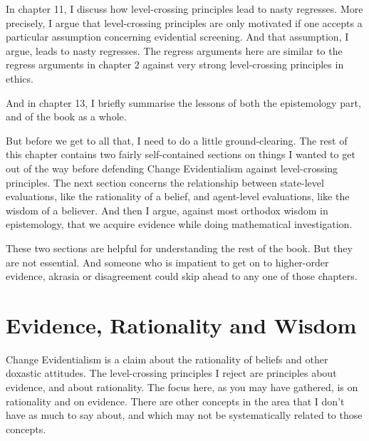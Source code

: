In chapter 11, I discuss how level-crossing principles lead to nasty regresses. More precisely, I argue that level-crossing principles are only motivated if one accepts a particular assumption concerning evidential screening. And that assumption, I argue, leads to nasty regresses. The regress arguments here are similar to the regress arguments in chapter 2 against very strong level-crossing principles in ethics.

And in chapter 13, I briefly summarise the lessons of both the epistemology part, and of the book as a whole.

But before we get to all that, I need to do a little ground-clearing. The rest of this chapter contains two fairly self-contained sections on things I wanted to get out of the way before defending Change Evidentialism against level-crossing principles. The next section concerns the relationship between state-level evaluations, like the rationality of a belief, and agent-level evaluations, like the wisdom of a believer. And then I argue, against most orthodox wisdom in epistemology, that we acquire evidence while doing mathematical investigation.

These two sections are helpful for understanding the rest of the book. But they are not essential. And someone who is impatient to get on to higher-order evidence, akrasia or disagreement could skip ahead to any one of those chapters.

\section{Evidence, Rationality and Wisdom}
\label{evidencerationalityandwisdom}

Change Evidentialism is a claim about the rationality of beliefs and other doxastic attitudes. The level-crossing principles I reject are principles about evidence, and about rationality. The focus here, as you may have gathered, is on rationality and on evidence. There are other concepts in the area that I don't have as much to say about, and which may not be systematically related to those concepts.

